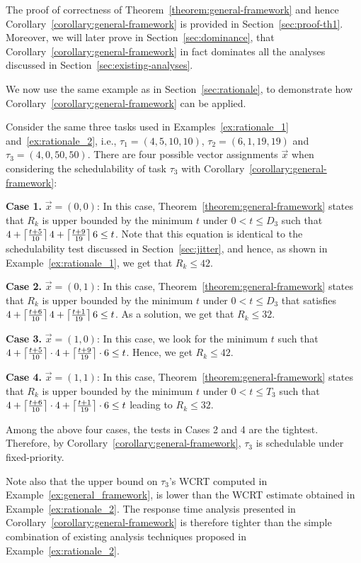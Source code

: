   The proof of correctness of Theorem~\ref{theorem:general-framework} and hence Corollary~\ref{corollary:general-framework} is provided in Section~\ref{sec:proof-th1}. Moreover, we will later prove in Section~\ref{sec:dominance}, that Corollary~\ref{corollary:general-framework} in fact dominates all the analyses discussed in Section~\ref{sec:existing-analyses}.
 
 We now use the same example as in Section~\ref{sec:rationale}, to demonstrate how
Corollary~\ref{corollary:general-framework} can be applied.
 
 \begin{example}
 \label{ex:general_framework}
  Consider the same three tasks used in Examples~\ref{ex:rationale_1} and~\ref{ex:rationale_2}, i.e., $\tau_1 = (4, 5, 10, 10)$, $\tau_2 =(6, 1, 19, 19)$ and $\tau_3 = (4, 0, 50, 50)$. There are four possible vector assignments $\vec{x}$ when considering the schedulability of task $\tau_3$ with Corollary~\ref{corollary:general-framework}:

\noindent\textbf{Case 1.} $\vec{x} = (0 , 0)$: In this case, Theorem~\ref{theorem:general-framework} states that $R_k$ is upper bounded by the minimum $t$ under $0 < t \leq D_3$ such that $4+ \left\lceil{\frac{t+5}{10}}\right\rceil 4 + \left\lceil{\frac{t+9}{19}}\right\rceil 6 \leq t$. Note that this equation is identical to the schedulability test discussed in Section~\ref{sec:jitter}, and hence, as shown in Example~\ref{ex:rationale_1}, we get that $R_k \leq 42$.

\noindent\textbf{Case 2.} $\vec{x} = (0 , 1)$:
 In this case, Theorem~\ref{theorem:general-framework} states that $R_k$ is upper bounded by  the minimum $t$
under $0 < t \leq D_3$ that satisfies $4+ \left\lceil{\frac{t+6}{10}}\right\rceil 4 + \left\lceil{\frac{t+1}{19}}\right\rceil 6 \leq t$. As a solution, we get that $R_k \leq 32$. %
       
\noindent\textbf{Case 3.} $\vec{x} = (1 , 0)$:
 In this case, we look for the minimum $t$ such that $4+ \left\lceil{\frac{t+5}{10}}\right\rceil\cdot 4 + \left\lceil{\frac{t+9}{19}}\right\rceil\cdot 6 \leq t$. Hence, we get $R_k \leq 42$.

\noindent\textbf{Case 4.} $\vec{x} = (1 , 1)$:
 In this case, Theorem~\ref{theorem:general-framework} states that $R_k$ is upper bounded by  the minimum $t$
under $0 < t \leq T_3$ such that $
       4+ \left\lceil{\frac{t+6}{10}}\right\rceil\cdot 4 + \left\lceil{\frac{t+1}{19}}\right\rceil\cdot 6 \leq t$ leading to $R_k \leq 32$.%

Among the above four cases, the tests in Cases 2 and 4 are the tightest. Therefore, by
Corollary~\ref{corollary:general-framework}, $\tau_3$ is
schedulable under fixed-priority.
\hfill\myendproof
 \end{example}

Note also that the upper bound on $\tau_3$'s WCRT computed in Example~\ref{ex:general_framework}, is lower than the WCRT estimate obtained in Example~\ref{ex:rationale_2}. The response time analysis presented in Corollary~\ref{corollary:general-framework} is therefore tighter than the simple combination of existing analysis techniques proposed in Example~\ref{ex:rationale_2}.



